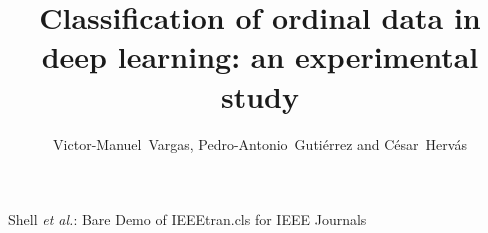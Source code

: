\documentclass[journal]{IEEEtran}
\begin{document}
	\title{Classification of ordinal data in deep learning: an experimental study}
	
	\author{Victor-Manuel~Vargas, Pedro-Antonio~Gutiérrez and César~Hervás}
	
	
	
	
	{Shell \MakeLowercase{\textit{et al.}}: Bare Demo of IEEEtran.cls for IEEE Journals}
	
\end{document}
